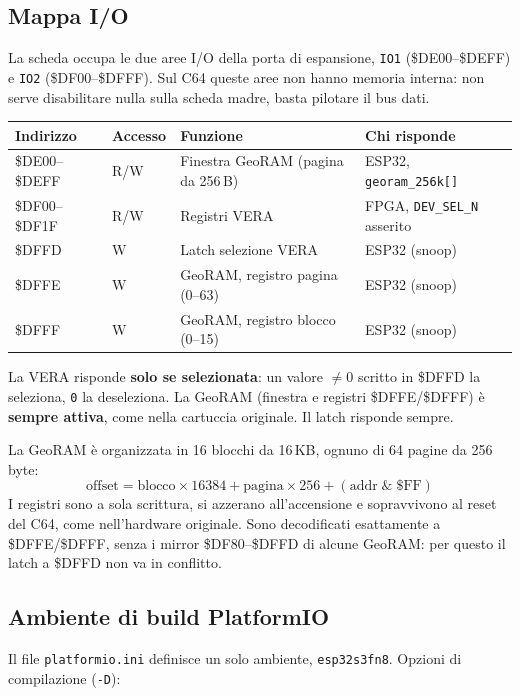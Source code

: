 \documentclass[12pt, a4paper]{article}
\begin{document}
\subsection{Mappa I/O}
La scheda occupa le due aree I/O della porta di espansione, \texttt{IO1} (\$DE00--\$DEFF) e \texttt{IO2} (\$DF00--\$DFFF). Sul C64 queste aree non hanno memoria interna: non serve disabilitare nulla sulla scheda madre, basta pilotare il bus dati.

\begin{center}
\begin{tabular}{lllp{4.5cm}}
\toprule
\textbf{Indirizzo} & \textbf{Accesso} & \textbf{Funzione} & \textbf{Chi risponde} \\
\midrule
\$DE00--\$DEFF & R/W & Finestra GeoRAM (pagina da 256\,B) & ESP32, \texttt{georam\_256k[]} \\
\$DF00--\$DF1F & R/W & Registri VERA & FPGA, \texttt{DEV\_SEL\_N} asserito \\
\$DFFD & W & Latch selezione VERA & ESP32 (snoop) \\
\$DFFE & W & GeoRAM, registro pagina (0--63) & ESP32 (snoop) \\
\$DFFF & W & GeoRAM, registro blocco (0--15) & ESP32 (snoop) \\
\bottomrule
\end{tabular}
\end{center}

La VERA risponde \textbf{solo se selezionata}: un valore $\neq 0$ scritto in \$DFFD la seleziona, \texttt{0} la deseleziona. La GeoRAM (finestra e registri \$DFFE/\$DFFF) è \textbf{sempre attiva}, come nella cartuccia originale. Il latch risponde sempre.

La GeoRAM è organizzata in 16 blocchi da 16\,KB, ognuno di 64 pagine da 256\,byte:
\[
\text{offset} = \text{blocco} \times 16384 + \text{pagina} \times 256 + (\text{addr} \;\&\; \text{\$FF})
\]
I registri sono a sola scrittura, si azzerano all'accensione e sopravvivono al reset del C64, come nell'hardware originale. Sono decodificati esattamente a \$DFFE/\$DFFF, senza i mirror \$DF80--\$DFFD di alcune GeoRAM: per questo il latch a \$DFFD non va in conflitto.

\subsection{Ambiente di build PlatformIO}
Il file \texttt{platformio.ini} definisce un solo ambiente, \texttt{esp32s3fn8}. Opzioni di compilazione (\texttt{-D}):
\end{document}

